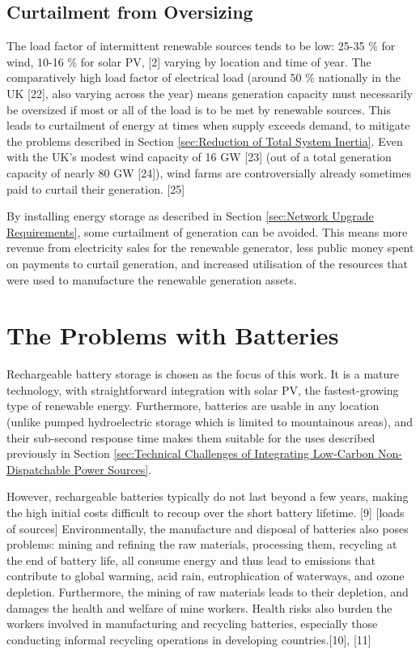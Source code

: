 \documentclass[report_18month.tex]{subfiles}
\begin{document}
\subsection{Curtailment from Oversizing}
The load factor of intermittent renewable sources tends to be low: 25-35 \% for wind, 10-16 \% for solar PV, [2] varying by location and time of year. The comparatively high load factor of electrical load (around 50 \% nationally in the UK [22], also varying across the year) means generation capacity must necessarily be oversized if most or all of the load is to be met by renewable sources. This leads to curtailment of energy at times when supply exceeds demand, to mitigate the problems described in Section \ref{sec:Reduction of Total System Inertia}. Even with the UK's modest wind capacity of 16 GW [23] (out of a total generation capacity of nearly 80 GW [24]), wind farms are controversially already sometimes paid to curtail their generation. [25]

By installing energy storage as described in Section \ref{sec:Network Upgrade Requirements}, some curtailment of generation can be avoided. This means more revenue from electricity sales for the renewable generator, less public money spent on payments to curtail generation, and increased utilisation of the resources that were used to manufacture the renewable generation assets.

\section{The Problems with Batteries}
Rechargeable battery storage is chosen as the focus of this work. It is a mature technology, with straightforward integration with solar PV, the fastest-growing type of renewable energy. Furthermore, batteries are usable in any location (unlike pumped hydroelectric storage which is limited to mountainous areas), and their sub-second response time makes them suitable for the uses described previously in Section \ref{sec:Technical Challenges of Integrating Low-Carbon Non-Dispatchable Power Sources}.

However, rechargeable batteries typically do not last beyond a few years, making the high initial costs difficult to recoup over the short battery lifetime. [9] [loads of sources] Environmentally, the manufacture and disposal of batteries also poses problems: mining and refining the raw materials, processing them, recycling at the end of battery life, all consume energy and thus lead to emissions that contribute to global warming, acid rain, eutrophication of waterways, and ozone depletion. Furthermore, the mining of raw materials leads to their depletion, and damages the health and welfare of mine workers. Health risks also burden the workers involved in manufacturing and recycling batteries, especially those conducting informal recycling operations in developing countries.[10], [11]
\end{document}
